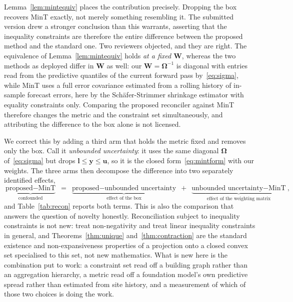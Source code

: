 \documentclass[11pt]{article}
\theoremstyle{plain}
\theoremstyle{definition}
\theoremstyle{remark}
\newcommand{\by}{\bm{y}}
\newcommand{\bOm}{\bm{\Omega}}
\newif\ifrevisionmarkup
\newcommand{\new}[1]{\ifrevisionmarkup\textcolor{revision}{#1}\else#1\fi}
\begin{document}
Lemma~\ref{lem:mintequiv} places the contribution precisely. Dropping the box recovers MinT exactly, not merely something resembling it. \new{The submitted version drew a stronger conclusion than this warrants, asserting that the inequality constraints are therefore the entire difference between the proposed method and the standard one. Two reviewers objected, and they are right. The equivalence of Lemma~\ref{lem:mintequiv} holds \emph{at a fixed $\bm{W}$}, whereas the two methods as deployed differ in $\bm{W}$ as well: our $\bm{W} = \bOm^{-1}$ is diagonal with entries read from the predictive quantiles of the current forward pass by~\eqref{eq:sigma}, while MinT uses a full error covariance estimated from a rolling history of in-sample forecast errors, here by the Sch\"afer-Strimmer shrinkage estimator \citep{schafer2005} with equality constraints only. Comparing the proposed reconciler against MinT therefore changes the metric and the constraint set simultaneously, and attributing the difference to the box alone is not licensed.}

\new{We correct this by adding a third arm that holds the metric fixed and removes only the box. Call it \emph{unbounded uncertainty}: it uses the same diagonal $\bOm$ of~\eqref{eq:sigma} but drops $\bm{l}\le\by\le\bm{u}$, so it is the closed form~\eqref{eq:mintform} with our weights. The three arms then decompose the difference into two separately identified effects,}
\new{\begin{equation}
\underbrace{\text{proposed} - \text{MinT}}_{\text{confounded}}
\;=\;
\underbrace{\text{proposed} - \text{unbounded uncertainty}}_{\text{effect of the box}}
\;+\;
\underbrace{\text{unbounded uncertainty} - \text{MinT}}_{\text{effect of the weighting matrix}},
\label{eq:decomposition}
\end{equation}}
\new{and Table~\ref{tab:recon} reports both terms. This is also the comparison that answers the question of novelty honestly. Reconciliation subject to inequality constraints is not new: \citet{wickramasuriya2020nonneg} treat non-negativity and \citet{girolimetto2023} treat linear inequality constraints in general, and Theorems~\ref{thm:unique} and~\ref{thm:contraction} are the standard existence and non-expansiveness properties of a projection onto a closed convex set specialised to this set, not new mathematics. What is new here is the combination put to work: a constraint set read off a building graph rather than an aggregation hierarchy, a metric read off a foundation model's own predictive spread rather than estimated from site history, and a measurement of which of those two choices is doing the work.}
\end{document}
